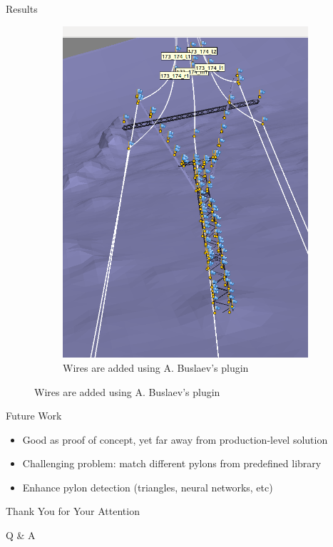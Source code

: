 \documentclass{beamer}
\begin{document}
\begin{frame}[t, fragile]{Results}
\begin{figure}
\begin{subfigure}{.5\textwidth}
\includegraphics[scale=0.15]{results_cool_wires}
\caption{Wires are added using A. Buslaev's plugin}
\end{subfigure}
\end{figure}
\end{frame}


\begin{frame}[t, fragile]{Future Work}
\begin{itemize}
\item Good as proof of concept, yet far away from production-level solution
\item Challenging problem: match different pylons from predefined library
\item Enhance pylon detection (triangles, neural networks, etc)
\end{itemize}
\end{frame}

\begin{frame}[fragile]{Thank You for Your Attention}

\begin{center}
\Huge Q \& A
\end{center}
\end{frame}
\end{document}
